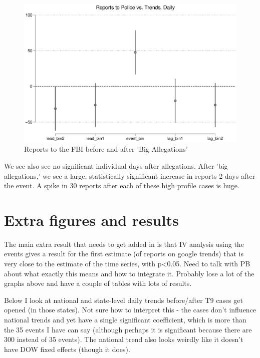 \documentclass[AER,draftmode]{AEA}
\begin{document}
\begin{figure}
\includegraphics[width=\linewidth]{figures/events_police_binned_big.eps}
\caption{Reports to the FBI before and after 'Big Allegations'}\label{figure:events_police_binned_big}
\end{figure}

We see also see no significant individual days after allegations. After 'big allegations,' we see a large, statistically significant increase in reports 2 days after the event. A spike in 30 reports after each of these high profile cases is huge.

\clearpage
\section{Extra figures and results}

The main extra result that needs to get added in is that IV analysis using the events gives a result for the first estimate (of reports on google trends) that is very close to the estimate of the time series, with p<0.05. Need to talk with PB about what exactly this means and how to integrate it. Probably lose a lot of the graphs above and have a couple of tables with lots of results.

Below I look at national and state-level daily trends before/after T9 cases get opened (in those states). Not sure how to interpret this - the cases don't influence national trends and yet have a single significant coefficient, which is more than the 35 events I have can say (although perhaps it is significant because there are 300 instead of 35 events). The national trend also looks weirdly like it doesn't have DOW fixed effects (though it does). 
\end{document}

